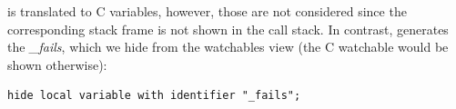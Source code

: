   is translated to C 
variables, however, those are not considered since the
corresponding stack frame is not shown in the call stack. In
contrast,  generates the 
\emph{\_fails}, which we hide from
the watchables view (the C watchable would be shown otherwise):

\begin{lstlisting}[frame=single,language=mbeddr]
hide local variable with identifier "_fails";
\end{lstlisting}